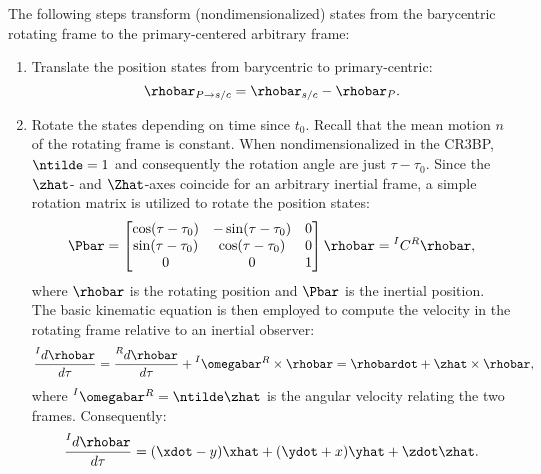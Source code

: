 The following steps transform (nondimensionalized) states from the barycentric rotating frame to
the primary-centered arbitrary frame:
\begin{enumerate}
    \item   Translate the position states from barycentric to primary-centric:
            \begin{equation}
                \rhobar_{P\rightarrow s/c}=\rhobar_{s/c}-\rhobar_{P}.
                \label{eq:translation}
            \end{equation}
    \item   Rotate the states depending on time since $t_{0}$. Recall that the mean motion $n$ of
            the rotating frame is constant. When nondimensionalized in the CR3BP, $\ntilde=1$ and
            consequently the rotation angle are just $\tau-\tau_{0}$. Since the $\zhat$- and
            $\Zhat$-axes coincide for an arbitrary inertial frame, a simple rotation matrix is
            utilized to rotate the position states:
            \begin{equation}
                \Pbar=\begin{bmatrix}   \cos(\tau-\tau_{0}) &   -\sin(\tau-\tau_{0})    &   0   \\
                                        \sin(\tau-\tau_{0}) &   \cos(\tau-\tau_{0})     &   0   \\
                                        0                   &   0                       &   1   \end{bmatrix}\rhobar=\prescript{I}{}{C}^{R}\rhobar,
                \label{eq:positionrotation}
            \end{equation}
            where $\rhobar$ is the rotating position and $\Pbar$ is the inertial position. The
            basic kinematic equation is then employed to compute the velocity in the rotating frame
            relative to an inertial observer:
            \begin{equation}
                \frac{\prescript{I}{}{d\rhobar}}{d\tau}=\frac{\prescript{R}{}{d\rhobar}}{d\tau}+\prescript{I}{}{\omegabar}^{R}\times\rhobar=\rhobardot+\zhat\times\rhobar,
                \label{eq:BKE}
            \end{equation}
            where $\prescript{I}{}{\omegabar}^{R}=\ntilde\zhat$ is the angular velocity relating
            the two frames. Consequently:
            \begin{equation}
                \frac{\prescript{I}{}{d\rhobar}}{d\tau}=(\xdot-y)\xhat+(\ydot+x)\yhat+\zdot\zhat.

\end{equation}
\end{enumerate}
